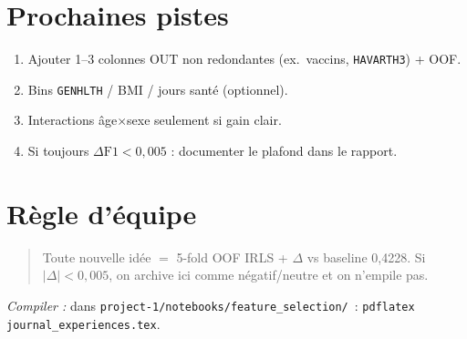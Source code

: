 \documentclass[11pt,a4paper]{article}
\begin{document}
\section{Prochaines pistes}
\begin{enumerate}
  \item Ajouter 1--3 colonnes OUT non redondantes (ex.\ vaccins, \texttt{HAVARTH3}) + OOF.
  \item Bins \texttt{GENHLTH} / BMI / jours santé (optionnel).
  \item Interactions âge$\times$sexe seulement si gain clair.
  \item Si toujours $\Delta\mathrm{F1}<0{,}005$ : documenter le plafond dans le rapport.
\end{enumerate}

\section{Règle d'équipe}
\begin{quote}
Toute nouvelle idée $=$ 5-fold OOF IRLS + $\Delta$ vs baseline 0{,}4228.
Si $|\Delta|<0{,}005$, on archive ici comme négatif/neutre et on n'empile pas.
\end{quote}

\noindent\textit{Compiler :} dans \texttt{project-1/notebooks/feature\_selection/}~:
\texttt{pdflatex journal\_experiences.tex}.
\end{document}
